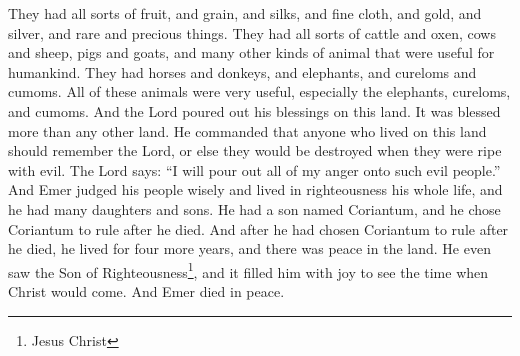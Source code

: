 They had all sorts of fruit, and grain, and silks, and fine cloth, and gold, and silver, and rare and precious things.
\bverse \iffalse And also all manner of cattle, of oxen, and cows, and of sheep, and of swine, and of goats, and also many other kinds of animals which were useful for the food of man. \fi
They had all sorts of cattle and oxen, cows and sheep, pigs and goats, and many other kinds of animal that were useful for humankind.
\bverse \iffalse And they also had horses, and asses, and there were elephants and cureloms and cumoms; all of which were useful unto man, and more especially the elephants and cureloms and cumoms. \fi
They had horses and donkeys, and elephants, and cureloms and cumoms. All of these animals were very useful, especially the elephants, cureloms, and cumoms.
\bverse \iffalse And thus the Lord did pour out his blessings upon this land, which was choice above all other lands; and he commanded that whoso should possess the land should possess it unto the Lord, or they should be destroyed when they were ripened in iniquity; for upon such, saith the Lord: I will pour out the fulness of my wrath. \fi
And the Lord poured out his blessings on this land. It was blessed more than any other land. He commanded that anyone who lived on this land should remember the Lord, or else they would be destroyed when they were ripe with evil. The Lord says: ``I will pour out all of my anger onto such evil people.''
\bverse \iffalse And Emer did execute judgment in righteousness all his days, and he begat many sons and daughters; and he begat Coriantum, and he anointed Coriantum to reign in his stead. \fi
And Emer judged his people wisely and lived in righteousness his whole life, and he had many daughters and sons. He had a son named Coriantum, and he chose Coriantum to rule after he died.
\bverse \iffalse And after he had anointed Coriantum to reign in his stead he lived four years, and he saw peace in the land; yea, and he even saw the Son of Righteousness, and did rejoice and glory in his day; and he died in peace. \fi
And after he had chosen Coriantum to rule after he died, he lived for four more years, and there was peace in the land. He even saw the Son of Righteousness\footnote{Jesus Christ}, and it filled him with joy to see the time when Christ would come. And Emer died in peace.
\bverse \iffalse And it came to pass that Coriantum did walk in the steps of his father, and did build many mighty cities, and did administer that which was good unto his people in all his days. And it came to pass that he had no children even until he was exceedingly old. \fi
